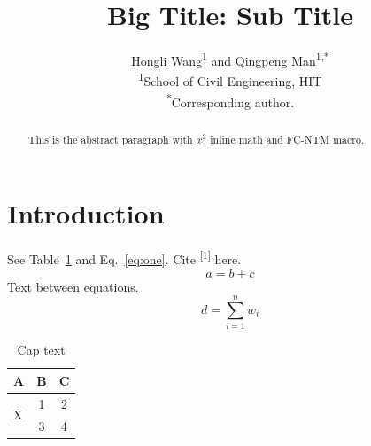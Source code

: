 \documentclass[11pt]{article}
\title{\bfseries Big Title: Sub Title}
\author{Hongli Wang\textsuperscript{1} and Qingpeng Man\textsuperscript{1,*}\\
\small\textsuperscript{1}School of Civil Engineering, HIT\\
\small\textsuperscript{*}Corresponding author.}
\date{}
\newcommand{\fcntm}{FC-NTM}
\begin{document}
\maketitle
\begin{abstract}
This is the abstract paragraph with $x^2$ inline math and \fcntm{} macro.
\end{abstract}
\section{Introduction}
See Table~\ref{tab:a} and Eq.~\eqref{eq:one}. Cite \textsuperscript{[1]} here.
\begin{equation}\label{eq:one}
a = b + c
\end{equation}
Text between equations.
\begin{equation}
d = \sum_{i=1}^{n} w_i
\end{equation}
\begin{table}[htbp]
\centering
\begin{tabular}{lcc}
\toprule
A & B & C\\
\midrule
\multirow{2}{*}{X} & 1 & 2\\
 & 3 & 4\\
\bottomrule
\end{tabular}
\caption{Cap text}
\label{tab:a}
\end{table}
\end{document}
